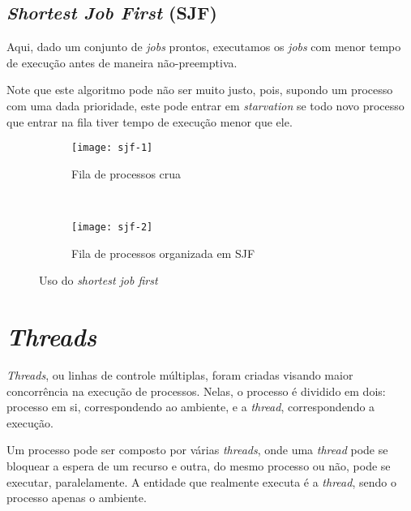 \subsection{\textit{Shortest Job First} (SJF)}
Aqui, dado um conjunto de \textit{jobs} prontos, executamos os \textit{jobs} com menor tempo de execução antes de maneira não-preemptiva.

Note que este algoritmo pode não ser muito justo, pois, supondo um processo com uma dada prioridade, este pode entrar em \textit{starvation} se todo novo processo que entrar na fila tiver tempo de execução menor que ele.

\begin{figure*}[h]
  \begin{subfigure}[t]{0.45\textwidth}
    \texttt{[image: sjf-1]}
    \caption{Fila de processos crua}
    \label{fig:sjf-1}
  \end{subfigure}
  ~
  \begin{subfigure}[t]{0.45\textwidth}
    \texttt{[image: sjf-2]}
    \caption{Fila de processos organizada em SJF}
    \label{fig:sjf-2}
  \end{subfigure}

  \caption{Uso do \textit{shortest job first}}
  \label{fig:sjf}
\end{figure*}





















\section{\textit{Threads}}
\textit{Threads}, ou linhas de controle múltiplas, foram criadas visando maior concorrência na execução de processos. Nelas, o processo é dividido em dois: processo em si, correspondendo ao ambiente, e a \textit{thread}, correspondendo a execução.

Um processo pode ser composto por várias \textit{threads}, onde uma \textit{thread} pode se bloquear a espera de um recurso e outra, do mesmo processo ou não, pode se executar, paralelamente. A entidade que realmente executa é a \textit{thread}, sendo o processo apenas o ambiente.

